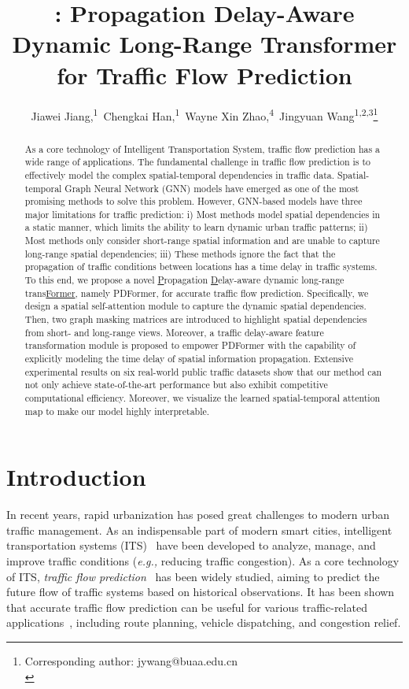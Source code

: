 \documentclass[letterpaper]{article} \usepackage{aaai23}  \usepackage{times}  \usepackage{helvet}  \usepackage{courier}  \usepackage[hyphens]{url}  \usepackage{graphicx} \urlstyle{rm} \def\UrlFont{\rm}  \usepackage{natbib}  \usepackage{caption} \frenchspacing  \setlength{\pdfpagewidth}{8.5in} \setlength{\pdfpageheight}{11in} \usepackage{algorithm}
\title{\name: Propagation Delay-Aware Dynamic Long-Range Transformer for Traffic Flow Prediction}
\author{
Jiawei Jiang,\textsuperscript{\rm 1}\equalcontrib\,
    Chengkai Han,\textsuperscript{\rm 1}\equalcontrib\,
    Wayne Xin Zhao,\textsuperscript{\rm 4}\,
    Jingyuan Wang\textsuperscript{\rm 1,\rm 2,\rm 3}\thanks{Corresponding author: jywang@buaa.edu.cn\\}
}
\newcommand{\name}{PDFormer\xspace}
\newcommand{\eg}{\emph{e.g.,}\xspace}
\begin{document}
\maketitle





\begin{abstract}
As a core technology of Intelligent Transportation System, traffic flow prediction has a wide range of applications. The fundamental challenge in traffic flow prediction is to effectively model the complex spatial-temporal dependencies in traffic data. Spatial-temporal Graph Neural Network (GNN) models have emerged as one of the most promising methods to solve this problem. However, GNN-based models have three major limitations for traffic prediction: i) Most methods model spatial dependencies in a static manner, which limits the ability to learn dynamic urban traffic patterns; ii) Most methods only consider short-range spatial information and are unable to capture long-range spatial dependencies; iii) These methods ignore the fact that the propagation of traffic conditions between locations has a time delay in traffic systems. To this end, we propose a novel \underline{P}ropagation \underline{D}elay-aware dynamic long-range trans\underline{Former}, namely \name, for accurate traffic flow prediction. Specifically, we design a spatial self-attention module to capture the dynamic spatial dependencies. Then, two graph masking matrices are introduced to highlight spatial dependencies from short- and long-range views. Moreover, a traffic delay-aware feature transformation module is proposed to empower \name with the capability of explicitly modeling the time delay of spatial information propagation. Extensive experimental results on six real-world public traffic datasets show that our method can not only achieve state-of-the-art performance but also exhibit competitive computational efficiency. Moreover, we visualize the learned spatial-temporal attention map to make our model highly interpretable.
\end{abstract}






\section{Introduction}

In recent years, rapid urbanization has posed great challenges to modern urban traffic management. As an indispensable part of modern smart cities, intelligent transportation systems (ITS)~\cite{intro} have been developed to analyze, manage, and improve traffic conditions (\eg reducing traffic congestion). As a core technology of ITS, \emph{traffic flow prediction}~\cite{intro2} has been widely studied, aiming to predict the future flow of traffic systems based on historical observations. It has been shown that accurate traffic flow prediction can be useful for various traffic-related applications~\cite{libcity}, including route planning, vehicle dispatching, and congestion relief.
\end{document}
